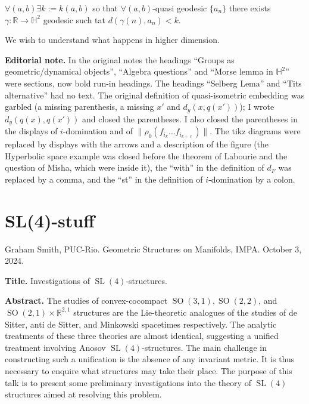 \begin{lemma}[Morse]
\label{lemma-potrie-morse}
$\forall (a,b)\exists k:=k(a,b)$ so that
$\forall (a,b)$-quasi geodesic $\{a_n\}$
there exists $\gamma :\mathbb{R}\to
\mathbb{H}^2$ geodesic such tat
$d(\gamma(n),a_n)<k$.
\end{lemma}

We wish to understand what happens in higher
dimension.

\medskip\noindent
{\bf Editorial note.}
In the original notes the headings ``Groups
as geometric/dynamical objects'', ``Algebra
questions'' and ``Morse lemma in
$\mathbb{H}^2$'' were sections, now bold
run-in headings. The headings ``Selberg
Lema'' and ``Tits alternative'' had no text.
The original definition of quasi-isometric
embedding was garbled (a missing parenthesis,
a missing $x'$ and $d_y(x,q(x'))$); I wrote
$d_y(q(x),q(x'))$ and closed the parentheses.
I also closed the parentheses in the displays
of $i$-domination and of
$\|\rho_0(f_{i_k}\ldots f_{i_{k+\ell}})\|$.
The tikz diagrams were replaced by displays
with the arrows and a description of the
figure (the Hyperbolic space example was
closed before the theorem of Labourie and the
question of Misha, which were inside it), the
``with'' in the definition of $d_F$ was
replaced by a comma, and the ``st'' in the
definition of $i$-domination by a colon.


\section{SL(4)-stuff}
\label{section-smith-sl4-stuff}

\noindent
Graham Smith, PUC-Rio. Geometric Structures
on Manifolds, IMPA. October 3, 2024.

\medskip\noindent
{\bf Title.}
Investigations of
$\operatorname{SL}(4)$-structures.

\medskip\noindent
{\bf Abstract.}
The studies of convex-cocompact
$\operatorname{SO}(3,1),\operatorname{SO}(2,
2)$,
and $\operatorname{SO}(2,1)\times
\mathbb{R}^{2,1}$ structures are the
Lie-theoretic analogues of the studies of de
Sitter, anti de Sitter, and Minkowski
spacetimes respectively. The analytic
treatments of these three theories are almost
identical, suggesting a unified treatment
involving Anosov
$\operatorname{SL}(4)$-structures. The main
challenge in constructing such a unification
is the absence of any invariant metric. It is
thus necessary to enquire what structures may
take their place. The purpose of this talk is
to present some preliminary investigations
into the theory of $\operatorname{SL}(4)$
structures aimed at resolving this problem.

